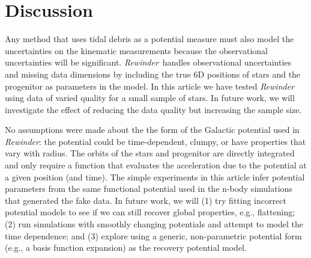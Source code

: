\documentclass[letterpaper,12pt,preprint]{aastex}
\newcommand{\rewinder}{\emph{Rewinder}}
\begin{document}
\section{Discussion}
Any method that uses tidal debris as a potential measure must also model the uncertainties on the kinematic measurements because the observational uncertainties will be significant. \rewinder\, handles observational uncertainties and missing data dimensions by including the true 6D positions of stars and the progenitor as parameters in the model. In this article we have tested \rewinder\, using data of varied quality for a small sample of stars. In future work, we will investigate the effect of reducing the data quality but increasing the sample size.

No assumptions were made about the the form of the Galactic potential used in \rewinder: the potential could be time-dependent, clumpy, or have properties that vary with radius. The orbits of the stars and progenitor are directly integrated and only require a function that evaluates the acceleration due to the potential at a given position (and time). The simple experiments in this article infer potential parameters from the same functional potential used in the n-body simulations that generated the fake data. In future work, we will (1) try fitting incorrect potential models to see if we can still recover global properties, e.g., flattening; (2) run simulations with smoothly changing potentials \citep[e.g.,][]{buist14} and attempt to model the time dependence; and (3) explore using a generic, non-parametric potential form (e.g., a basis function expansion) as the recovery potential model. 
\end{document}
